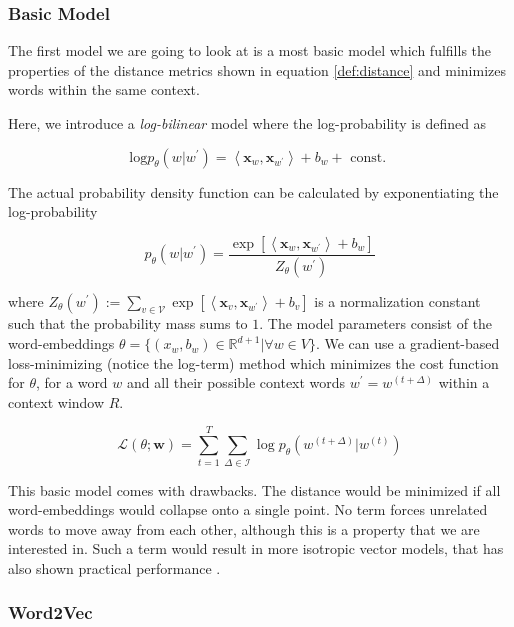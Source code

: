 \documentclass[a4paper,12pt,oneside,openright]{report}
\begin{document}
\subsubsection{Basic Model}

The first model we are going to look at is a most basic model which fulfills the properties of the distance metrics shown in equation \eqref{def:distance} and minimizes words within the same context.

Here, we introduce a \textit{log-bilinear} \cite{cil_slides} model where the log-probability is defined as

\begin{equation}
\text{log} p_{\theta}(w | w^{\prime}) = \left\langle\mathbf{x}_{w}, \mathbf{x}_{w^{\prime}}\right\rangle+b_{w} + \text { const. }
\end{equation}

The actual probability density function can be calculated by exponentiating the log-probability

$$
p_{\theta}\left(w | w^{\prime}\right)=\frac{\exp \left[\left\langle\mathbf{x}_{w}, \mathbf{x}_{w^{\prime}}\right\rangle+b_{w}\right]}{Z_{\theta}\left(w^{\prime}\right)}
$$

where $Z_{\theta}\left(w^{\prime}\right):=\sum_{v \in \mathcal{V}} \exp \left[\left\langle\mathbf{x}_{v}, \mathbf{x}_{w^{\prime}}\right\rangle+b_{v}\right]$ is a normalization constant such that the probability mass sums to $1$.
The model parameters consist of the word-embeddings $  \theta = \{ (x_w, b_w ) \in \mathbb{R}^{d+1} | \forall w \in V \}$.
We can use a gradient-based loss-minimizing (notice the log-term) method which minimizes the cost function for $\theta$, for a word $w$ and all their possible context words $w^{\prime} = w^{(t+\Delta)}$ within a context window $R$.

$$
\mathcal{L}(\theta ; \mathbf{w})=\sum_{t=1}^{T} \sum_{\Delta \in \mathcal{I}} \log p_{\theta}\left(w^{(t+\Delta)} | w^{(t)}\right)
$$

This basic model comes with drawbacks. 
The distance would be minimized if all word-embeddings would collapse onto a single point. 
No term forces unrelated words to move away from each other, although this is a property that we are interested in.
Such a term would result in more isotropic vector models, that has also shown practical performance \cite{ethayarajh19}.


\subsubsection{Word2Vec}
\end{document}
